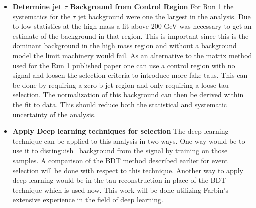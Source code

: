 \begin{itemize}[noitemsep,nolistsep,leftmargin=*]
\item[]{{\bf Determine jet \too $\tau$ Background from Control Region}  %
For Run 1 the systematics for the $\tau$ \too jet background were one the largest in the analysis.  Due to low statistics at the high mass a fit above 200 GeV was necessary to get 
an estimate of the background in that region.  This is important since this is the dominant background in the high mass region and without a background model the limit machinery would fail.
As an alternative to the matrix method used for the Run 1 published paper one can use a control region with no signal and loosen the selection criteria to introduce more fake taus.  This can be done
by requiring a zero b-jet region and only requiring a loose tau selection.  The normalization of this background can then be derived within the fit to data.  This should reduce both the statistical and systematic uncertainty of the analysis.}

\item[]{{\bf Apply Deep learning techniques for selection}
The deep learning technique can be applied to this analysis in two ways.  One way would be to use it to distinguish \ttbar\ background from the signal by training on those samples.
A comparison of the BDT method described earlier for event selection will be done with respect to this technique.
Another way to apply deep learning would be in the tau reconstruction in place of the BDT technique which is used now.  This work will be done utilizing Farbin's extensive experience in the field of deep learning.}




\end{itemize}
